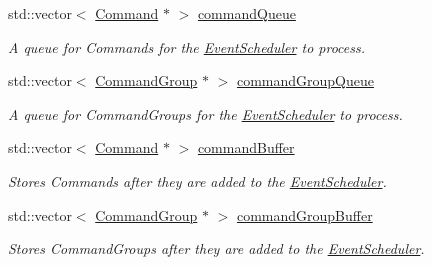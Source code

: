 \begin{DoxyCompactItemize}
std\+::vector$<$ \mbox{\hyperlink{classlib_iterative_robot_1_1_command}{Command}} $\ast$ $>$ \mbox{\hyperlink{classlib_iterative_robot_1_1_event_scheduler_a24710c3528945cb3ed1e9ae61267b570}{command\+Queue}}
\begin{DoxyCompactList}\small\item\em A queue for Commands for the \mbox{\hyperlink{classlib_iterative_robot_1_1_event_scheduler}{Event\+Scheduler}} to process. \end{DoxyCompactList}\item 
\mbox{\label{classlib_iterative_robot_1_1_event_scheduler_a355d50b2ab9edbb9295cd0a540422be6}} 
std\+::vector$<$ \mbox{\hyperlink{classlib_iterative_robot_1_1_command_group}{Command\+Group}} $\ast$ $>$ \mbox{\hyperlink{classlib_iterative_robot_1_1_event_scheduler_a355d50b2ab9edbb9295cd0a540422be6}{command\+Group\+Queue}}
\begin{DoxyCompactList}\small\item\em A queue for Command\+Groups for the \mbox{\hyperlink{classlib_iterative_robot_1_1_event_scheduler}{Event\+Scheduler}} to process. \end{DoxyCompactList}\item 
std\+::vector$<$ \mbox{\hyperlink{classlib_iterative_robot_1_1_command}{Command}} $\ast$ $>$ \mbox{\hyperlink{classlib_iterative_robot_1_1_event_scheduler_a1ddae49a738b69e0e73b4b529a585226}{command\+Buffer}}
\begin{DoxyCompactList}\small\item\em Stores Commands after they are added to the \mbox{\hyperlink{classlib_iterative_robot_1_1_event_scheduler}{Event\+Scheduler}}. \end{DoxyCompactList}\item 
std\+::vector$<$ \mbox{\hyperlink{classlib_iterative_robot_1_1_command_group}{Command\+Group}} $\ast$ $>$ \mbox{\hyperlink{classlib_iterative_robot_1_1_event_scheduler_a37b0c1d9ec0c00e7729bec67ebbd9986}{command\+Group\+Buffer}}
\begin{DoxyCompactList}\small\item\em Stores Command\+Groups after they are added to the \mbox{\hyperlink{classlib_iterative_robot_1_1_event_scheduler}{Event\+Scheduler}}. \end{DoxyCompactList}\item 
\mbox{\label{classlib_iterative_robot_1_1_event_scheduler_a91ac686fb045bce48f6debdb0a351c20}} 

\end{DoxyCompactItemize}
